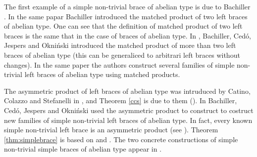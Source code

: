 The first example of a simple non-trivial brace of abelian type is due to Bachiller \cite{MR3763276}. 
In the same papar Bachiller introduced the matched product of two left braces of abelian type. One can see that the definition of matched product of two left braces is the same that in the case of braces of abelian type. 
In \cite{MR3812099}, Bachiller, Ced\'o, Jespers and Okni\'{n}ski introduced the matched product of more than two left braces of abelian type (this can be generaliced to arbitrari left braces without changes). In the same paper the authors construct several families of  simple non-trivial left braces of abelian type using matched products.

The asymmetric product of left braces of abelian type was intruduced by Catino, Colazzo and Stefanelli in \cite{MR3478858}, and Theorem \ref{ccs} is due to them (\cite[Theorem 3]{MR3478858}).  In \cite{MR4020748} Bachiller, Ced\'o, Jespers and Okni\'{n}ski used the asymmetric product to construct to costruct new families of simple non-trivial left braces of abelian type. In fact, every known simple non-trivial left brace is an asymmetric product (see \cite{MR4020748, MR4161288, MR4122077}).
Theorem \ref{thm:simplebrace} is based on \cite[Theorem 3.6]{MR3812099} and \cite[Theorem 6.2]{MR4020748}. The two concrete constructions of simple non-trivial simple braces of abelian type appear in \cite{MR3812099,  MR4161288}.
